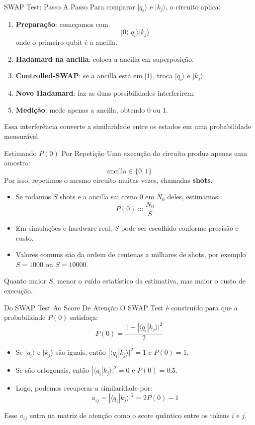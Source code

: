 \begin{frame}{SWAP Test: Passo A Passo}
    Para comparar $|q_i\rangle$ e $|k_j\rangle$, o circuito aplica:
    \begin{enumerate}
        \item \textbf{Preparação}: começamos com
        \[
            |0\rangle|q_i\rangle|k_j\rangle
        \]
        onde o primeiro qubit é a ancilla.
        \item \textbf{Hadamard na ancilla}: coloca a ancilla em superposição.
        \item \textbf{Controlled-SWAP}: se a ancilla está em $|1\rangle$, troca $|q_i\rangle$ e $|k_j\rangle$.
        \item \textbf{Novo Hadamard}: faz as duas possibilidades interferirem.
        \item \textbf{Medição}: mede apenas a ancilla, obtendo $0$ ou $1$.
    \end{enumerate}
    \vspace{0.2em}
    Essa interferência converte a similaridade entre os estados em uma probabilidade mensurável.
\end{frame}

\begin{frame}{Estimando $P(0)$ Por Repetição}
    Uma execução do circuito produz apenas uma amostra:
    \[
        \text{ancilla} \in \{0,1\}
    \]
    Por isso, repetimos o mesmo circuito muitas vezes, chamadas \textbf{shots}.
    \begin{itemize}
        \item Se rodamos $S$ shots e a ancilla sai como $0$ em $N_0$ deles, estimamos:
        \[
            P(0) \approx \frac{N_0}{S}
        \]
        \item Em simulações e hardware real, $S$ pode ser escolhido conforme precisão e custo.
        \item Valores comuns são da ordem de centenas a milhares de shots, por exemplo $S=1000$ ou $S=10000$.
    \end{itemize}
    \vspace{0.2em}
    Quanto maior $S$, menor o ruído estatístico da estimativa, mas maior o custo de execução.
\end{frame}

\begin{frame}{Do SWAP Test Ao Score De Atenção}
    O SWAP Test é construído para que a probabilidade $P(0)$ satisfaça:
    \[
        P(0) = \frac{1 + |\langle q_i | k_j \rangle|^2}{2}
    \]
    \begin{itemize}
        \item Se $|q_i\rangle$ e $|k_j\rangle$ são iguais, então $|\langle q_i | k_j \rangle|^2 = 1$ e $P(0)=1$.
        \item Se são ortogonais, então $|\langle q_i | k_j \rangle|^2 = 0$ e $P(0)=0.5$.
        \item Logo, podemos recuperar a similaridade por:
        \[
            a_{ij} = |\langle q_i | k_j \rangle|^2 = 2P(0)-1
        \]
    \end{itemize}
    \vspace{0.3em}
    Esse $a_{ij}$ entra na matriz de atenção como o score quântico entre os tokens $i$ e $j$.
\end{frame}

